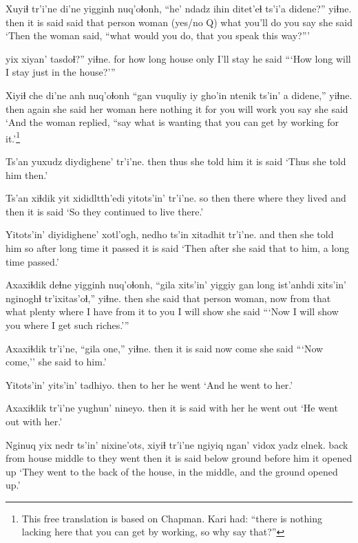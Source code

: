 \documentclass[12pt]{article}
\begin{document}
\gll Xuyiɬ tr'i'ne di'ne yigginh nuq'oɬonh, ``he'  {ndadz ihin}  ditet'eɬ ts'i'a  didene?'' yiɬne.
then {it is said} said  {that person}  woman {(yes/no Q)} what {you'll do} {}  {you say}  {she said}
\glt `Then the woman said, ``what would you do, that you speak this way?'''
\glend

 yix xiyan' tasdoɬ?'' yiɬne.
{for how long}   house only  {I'll stay} {he said}
\glt ```How long will I stay just in the house?'''
\glend

\gll Xiyiɬ che di'ne anh nuq'oɬonh ``gan vuquliy iy gho'in ntenik ts'in' a didene,'' yiɬne.
then again {she said} her woman here nothing it for {you will work} {} {} {you say} {she said}
\glt `And the woman replied, ``say what is wanting that you can get by working for it.'\footnote{This free translation is based on Chapman. Kari had: ``there is nothing lacking here that you can get by working, so why say that?''}
\glend

\gll Ts'an yuxudz diydighene' tr'i'ne.
then thus  {she told him}  {it is said}
\glt `Thus she told him then.'
\glend

\gll Ts'an xiɬdik  yit xididltth'edi yitots'in' tr'i'ne.
so then there {where they lived} {and then} {it is said}
\glt `So they continued to live there.'
\glend

\gll Yitots'in' diyidighene' xotl'ogh, nedho ts'in xitadhit tr'i'ne.
{and then} {she told him so} after  {long time} {} {it passed}  {it is said}
\glt `Then after she said that to him, a long time passed.'
\glend

\gll Axaxiɬdik deɬne yigginh nuq'oɬonh, ``gila xits'in' yiggiy gan long ist'anhdi xits'in' nginoghɬ tr'ixitas'oɬ,'' yiɬne.
then {she said} {that person} woman, now  from that what plenty {where I have} {from it} {to you} {I will show} {she said}
\glt ```Now I will show you where I get such riches.'''
\glend

\gll Axaxiɬdik tr'i'ne, ``gila one,'' yiɬne.
then  {it is said} now  come {she said}
\glt ```Now come,'' she said to him.'
\glend

\gll Yitots'in' yits'in' tadhiyo.
then  {to her} {he went}
\glt `And he went to her.'
\glend

\gll Axaxiɬdik tr'i'ne yughun' nineyo.
then  {it is said} {with her} {he went out}
\glt `He went out with her.'
\glend

\gll Nginuq yix nedr ts'in' nixine'ots, xiyiɬ tr'i'ne ngiyiq ngan' vidox  {yadz elnek.}
{back from} house middle to {they went} then {it is said} below  ground {before him} {it opened up}
\glt `They went to the back of the house, in the middle, and the ground opened up.'
\glend
\end{document}
